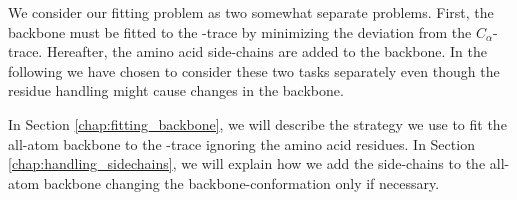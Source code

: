 We consider our fitting problem as two somewhat separate problems.
First, the backbone must be fitted to the \Ca-trace by minimizing
the deviation from the $C_{\alpha}$-trace.  Hereafter, the amino acid
side-chains are added to the backbone.  In the following we have chosen to
consider these two tasks separately even though the residue handling
might cause changes in the backbone.

In Section \ref{chap:fitting_backbone}, we will describe the strategy we use to fit the all-atom backbone to the \Ca-trace ignoring the amino acid residues.
In Section \ref{chap:handling_sidechains}, we will explain how we add the side-chains to the all-atom backbone changing the backbone-conformation only if necessary.

